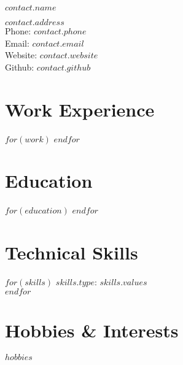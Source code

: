 \documentclass{cv-class}
\begin{document}
{\LARGE $contact.name$}\\
\smallskip

$contact.address$\\
Phone: $contact.phone$\\
Email: $contact.email$\\
Website: $contact.website$\\
Github: $contact.github$

\section*{Work Experience}
$for(work)$
$endfor$

\section*{Education}
$for(education)$
$endfor$

\section*{Technical Skills}
$for(skills)$
$skills.type$: $skills.values$\\
$endfor$

\section*{Hobbies \& Interests}
$hobbies$
\end{document}

